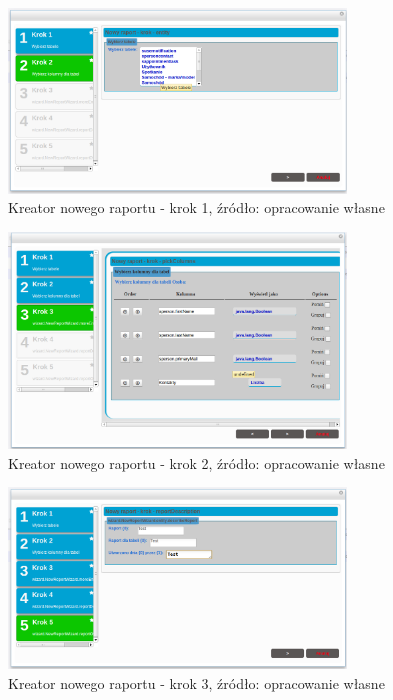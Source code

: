 	\begin{figure}[H]
		\centering
		\includegraphics[width=0.80\textwidth]{images/rbuilder_step1}
		\caption[Kreator nowego raportu - krok 1]{Kreator nowego raportu - krok 1, źródło: opracowanie własne}
		\label{app:wizard_newReport_step1}
	\end{figure}	
	\begin{figure}[h]
		\centering
		\includegraphics[width=0.80\textwidth]{images/rbuilder_step2}
		\caption[Kreator nowego raportu - krok 2]{Kreator nowego raportu - krok 2, źródło: opracowanie własne}
		\label{app:wizard_newReport_step2}
	\end{figure}		
	\begin{figure}[h]
		\centering
		\includegraphics[width=0.80\textwidth]{images/rbuilder_step3}
		\caption[Kreator nowego raportu - krok 3]{Kreator nowego raportu - krok 3, źródło: opracowanie własne}
		\label{app:wizard_newReport_step2}
	\end{figure}		

